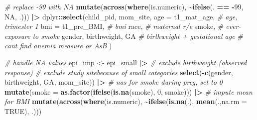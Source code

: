 \documentclass[12pt, twoside]{amherstthesis}
\newenvironment{Shaded}{\begin{snugshade}}{\end{snugshade}}
\newcommand{\AttributeTok}[1]{\textcolor[rgb]{0.13,0.29,0.53}{#1}}
\newcommand{\CommentTok}[1]{\textcolor[rgb]{0.56,0.35,0.01}{\textit{#1}}}
\newcommand{\ConstantTok}[1]{\textcolor[rgb]{0.56,0.35,0.01}{#1}}
\newcommand{\DecValTok}[1]{\textcolor[rgb]{0.00,0.00,0.81}{#1}}
\newcommand{\FunctionTok}[1]{\textcolor[rgb]{0.13,0.29,0.53}{\textbf{#1}}}
\newcommand{\NormalTok}[1]{#1}
\newcommand{\OtherTok}[1]{\textcolor[rgb]{0.56,0.35,0.01}{#1}}
\newcommand{\SpecialCharTok}[1]{\textcolor[rgb]{0.81,0.36,0.00}{\textbf{#1}}}
\begin{document}
\begin{Shaded}
\begin{Highlighting}[]
  \CommentTok{\# replace {-}99 with NA}
  \FunctionTok{mutate}\NormalTok{(}\FunctionTok{across}\NormalTok{(}\FunctionTok{where}\NormalTok{(is.numeric), }\SpecialCharTok{\textasciitilde{}}\FunctionTok{ifelse}\NormalTok{(. }\SpecialCharTok{==} \SpecialCharTok{{-}}\DecValTok{99}\NormalTok{, }\ConstantTok{NA}\NormalTok{, .)))  }\SpecialCharTok{|\textgreater{}} 
\NormalTok{  dplyr}\SpecialCharTok{::}\FunctionTok{select}\NormalTok{(child\_pid, mom\_site, }
                \AttributeTok{age =}\NormalTok{ t1\_mat\_age, }\CommentTok{\# age, trimester 1}
                \AttributeTok{bmi =}\NormalTok{ t1\_pre\_BMI, }\CommentTok{\# bmi}
\NormalTok{                race, }\CommentTok{\# maternal r/e}
\NormalTok{                smoke, }\CommentTok{\# ever{-}exposure to smoke}
\NormalTok{                gender, birthweight, GA }\CommentTok{\# birthweight + gestational age}
                \CommentTok{\# can\textquotesingle{}t find anemia measure or AsB}
\NormalTok{  ) }

\CommentTok{\# handle NA values}
\NormalTok{epi\_imp }\OtherTok{\textless{}{-}}\NormalTok{ epi\_small }\SpecialCharTok{|\textgreater{}} 
  \CommentTok{\# exclude birthweight (observed response)}
  \CommentTok{\# exclude study sitebecause of small categories}
  \FunctionTok{select}\NormalTok{(}\SpecialCharTok{{-}}\FunctionTok{c}\NormalTok{(gender, birthweight, GA, mom\_site)) }\SpecialCharTok{|\textgreater{}} 
  \CommentTok{\# na\textquotesingle{}s for smoke during preg, set to 0}
  \FunctionTok{mutate}\NormalTok{(}\AttributeTok{smoke =} \FunctionTok{as.factor}\NormalTok{(}\FunctionTok{ifelse}\NormalTok{(}\FunctionTok{is.na}\NormalTok{(smoke), }\DecValTok{0}\NormalTok{, smoke))) }\SpecialCharTok{|\textgreater{}} 
  \CommentTok{\# impute mean for BMI}
  \FunctionTok{mutate}\NormalTok{(}\FunctionTok{across}\NormalTok{(}\FunctionTok{where}\NormalTok{(is.numeric), }
                \SpecialCharTok{\textasciitilde{}}\FunctionTok{ifelse}\NormalTok{(}\FunctionTok{is.na}\NormalTok{(.), }\FunctionTok{mean}\NormalTok{(.,}\AttributeTok{na.rm =} \ConstantTok{TRUE}\NormalTok{), .))) }
\end{Highlighting}
\end{Shaded}
\end{document}
